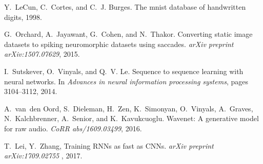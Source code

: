 \documentclass{article}
\begin{document}
\begin{thebibliography}{19}
Y.~LeCun, C.~Cortes, and C.~J. Burges.
\newblock The mnist database of handwritten digits, 1998.

G.~Orchard, A.~Jayawant, G.~Cohen, and N.~Thakor.
\newblock Converting static image datasets to spiking neuromorphic datasets
  using saccades.
\newblock \emph{arXiv preprint arXiv:1507.07629}, 2015.

I.~Sutskever, O.~Vinyals, and Q.~V. Le.
\newblock Sequence to sequence learning with neural networks.
\newblock In \emph{Advances in neural information processing systems}, pages
  3104--3112, 2014.

A.~van~den Oord, S.~Dieleman, H.~Zen, K.~Simonyan, O.~Vinyals, A.~Graves,
  N.~Kalchbrenner, A.~Senior, and K.~Kavukcuoglu.
\newblock Wavenet: A generative model for raw audio.
\newblock \emph{CoRR abs/1609.03499}, 2016.

T.~Lei, Y.~Zhang,
\newblock Training RNNs as fast as CNNs.
\newblock \emph{arXiv preprint arXiv:1709.02755 }, 2017.

\end{thebibliography}
\end{document}
